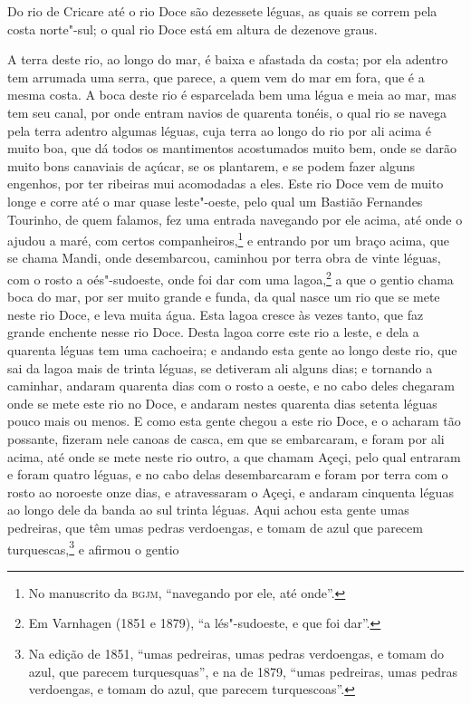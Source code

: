 Do rio de Cricare até o rio Doce são dezessete léguas, as quais se correm pela costa
norte"-sul; o qual rio Doce está em altura de dezenove graus.

A terra deste rio, ao longo do mar, é baixa e afastada da costa; por ela adentro tem
arrumada uma serra, que parece, a quem vem do mar em fora, que é a mesma costa. A boca
deste rio é esparcelada bem uma légua e meia ao mar, mas tem seu canal, por onde entram
navios de quarenta tonéis, o qual rio se navega pela terra adentro algumas léguas, cuja
terra ao longo do rio por ali acima é muito boa, que dá todos os mantimentos acostumados
muito bem, onde se darão muito bons canaviais de açúcar, se os plantarem, e se podem fazer
alguns engenhos, por ter ribeiras mui acomodadas a eles. Este rio Doce vem de muito longe
e corre até o mar quase leste"-oeste, pelo qual um Bastião Fernandes Tourinho, de quem
falamos, fez uma entrada navegando por ele acima, até onde o ajudou a maré, com certos
companheiros,\footnote{ No manuscrito da \textsc{bgjm}, ``navegando por ele, até onde''.}
e entrando por um braço acima, que se chama Mandi, onde desembarcou, caminhou por terra
obra de vinte léguas, com o rosto a oés"-sudoeste, onde foi dar com uma lagoa,\footnote{ Em
Varnhagen (1851 e 1879), ``a lés"-sudoeste, e que foi dar''.} a que o gentio chama boca do
mar, por ser muito grande e funda, da qual nasce um rio que se mete neste rio Doce, e leva
muita água. Esta lagoa cresce às vezes tanto, que faz grande enchente nesse rio Doce.
Desta lagoa corre este rio a leste, e dela a quarenta léguas tem uma cachoeira; e andando
esta gente ao longo deste rio, que sai da lagoa mais de trinta léguas, se detiveram ali
alguns dias; e tornando a caminhar, andaram quarenta dias com o rosto a oeste, e no cabo
deles chegaram onde se mete este rio no Doce, e andaram nestes quarenta dias setenta
léguas pouco mais ou menos. E como esta gente chegou a este rio Doce, e o acharam tão
possante, fizeram nele canoas de casca, em que se embarcaram, e foram por ali acima, até
onde se mete neste rio outro, a que chamam Açeçi, pelo qual entraram e foram quatro
léguas, e no cabo delas desembarcaram e foram por terra com o rosto ao noroeste onze dias,
e atravessaram o Açeçi, e andaram cinquenta léguas ao longo dele da banda ao sul trinta
léguas. Aqui achou esta gente umas pedreiras, que têm umas pedras verdoengas, e tomam de
azul que parecem turquescas,\footnote{ Na edição de 1851, ``umas pedreiras, umas pedras
verdoengas, e tomam do azul, que parecem turquesquas'', e na de 1879, ``umas pedreiras,
umas pedras verdoengas, e tomam do azul, que parecem turquescoas''.} e afirmou o gentio

